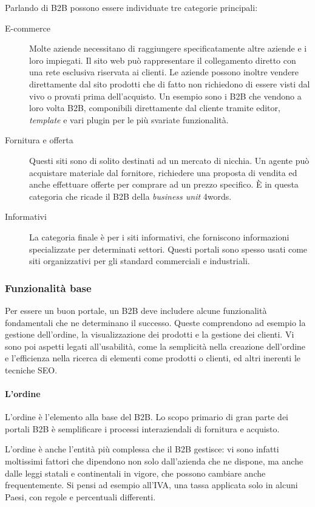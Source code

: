 Parlando di B2B possono essere individuate tre categorie principali:
\begin{description}
	\item[E-commerce] Molte aziende necessitano di raggiungere specificatamente altre aziende e i loro impiegati. Il sito web può rappresentare il collegamento diretto con una rete esclusiva riservata ai clienti. Le aziende possono inoltre vendere direttamente dal sito prodotti che di fatto non richiedono di essere visti dal vivo o provati prima dell'acquisto. Un esempio sono i B2B che vendono a loro volta B2B, componibili direttamente dal cliente tramite editor, \textit{template} e vari plugin per le più svariate funzionalità.
	
	\item[Fornitura e offerta] Questi siti sono di solito destinati ad un mercato di nicchia. Un agente può acquistare materiale dal fornitore, richiedere una proposta di vendita ed anche effettuare offerte per comprare ad un prezzo specifico. È in questa categoria che ricade il B2B della \textit{business unit} 4words.
	
	\item[Informativi] La categoria finale è per i siti informativi, che forniscono informazioni specializzate per determinati settori. Questi portali sono spesso usati come siti organizzativi per gli standard commerciali e industriali.
\end{description}

\subsubsection{Funzionalità base}
Per essere un buon portale, un B2B deve includere alcune funzionalità fondamentali che ne determinano il successo. Queste comprendono ad esempio la gestione dell'ordine, la visualizzazione dei prodotti e la gestione dei clienti. Vi sono poi aspetti legati all'usabilità, come la semplicità nella creazione dell'ordine e l'efficienza nella ricerca di elementi come prodotti o clienti, ed altri inerenti le tecniche SEO.

\paragraph{L'ordine}
L'ordine è l'elemento alla base del B2B. Lo scopo primario di gran parte dei portali B2B è semplificare i processi interaziendali di fornitura e acquisto. 

L'ordine è anche l'entità più complessa che il B2B gestisce: vi sono infatti moltissimi fattori che dipendono non solo dall'azienda che ne dispone, ma anche dalle leggi statali e continentali in vigore, che possono cambiare anche frequentemente. Si pensi ad esempio all'\Gls{IVA}, una tassa applicata solo in alcuni Paesi, con regole e percentuali differenti.

